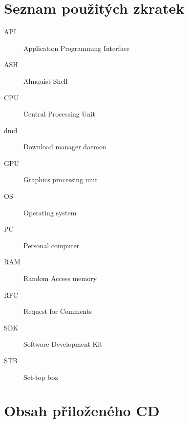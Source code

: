 \documentclass[thesis=B,czech]{FITthesis}[2012/06/26]
\begin{document}
\chapter{Seznam použitých zkratek}
\begin{description}
	\item[API] Application Programming Interface
	\item[ASH] Almquist Shell
	\item[CPU] Central Processing Unit
	\item[dmd] Download manager daemon
	\item[GPU] Graphics processing unit
	\item[OS] Operating system
	\item[PC] Personal computer
	\item[RAM] Random Access memory
	\item[RFC] Request for Comments
	\item[SDK] Software Development Kit
	\item[STB] Set-top box
\end{description}

\chapter{Obsah přiloženého CD}

\begin{figure}
\end{figure}
\end{document}
